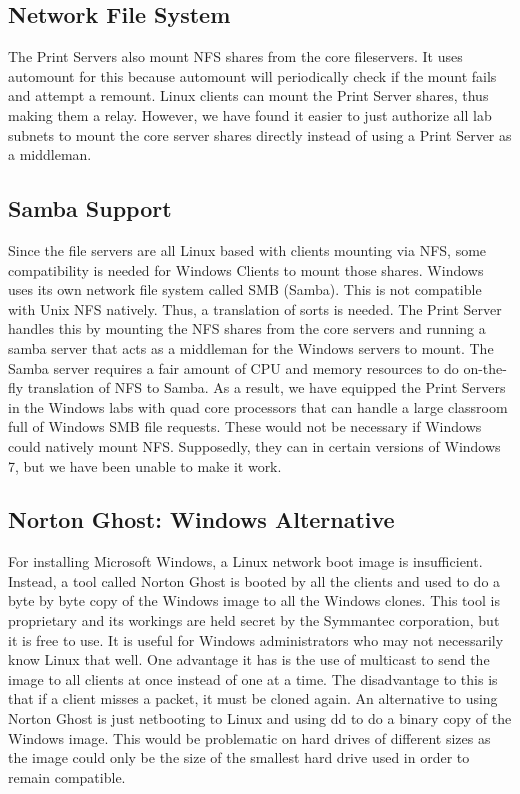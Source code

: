 \subsection{Network File System}
The Print Servers also mount NFS shares from the core fileservers.  It uses automount for this because automount will periodically check if the mount fails and attempt a remount.  Linux clients can mount the Print Server shares, thus making them a relay.  However, we have found it easier to just authorize all lab subnets to mount the core server shares directly instead of using a Print Server as a middleman.  

\subsection{Samba Support}
Since the file servers are all Linux based with clients mounting via NFS, some compatibility is needed for Windows Clients to mount those shares.  Windows uses its own network file system called SMB (Samba).  This is not compatible with Unix NFS natively.  Thus, a translation of sorts is needed.  The Print Server handles this by mounting the NFS shares from the core servers and running a samba server that acts as a middleman for the Windows servers to mount.  The Samba server requires a fair amount of CPU and memory resources to do on-the-fly translation of NFS to Samba. As a result, we have equipped the Print Servers in the Windows labs with quad core processors that can handle a large classroom full of Windows SMB file requests. These would not be necessary if Windows could natively mount NFS. Supposedly, they can in certain versions of Windows 7, but we have been unable to make it work.

\subsection{Norton Ghost:  Windows Alternative}
For installing Microsoft Windows, a Linux network boot image is insufficient.  Instead, a tool called Norton Ghost is booted by all the clients and used to do a byte by byte copy of the Windows image to all the Windows clones.  This tool is proprietary and its workings are held secret by the Symmantec corporation, but it is free to use.  It is useful for Windows administrators who may not necessarily know Linux that well.  One advantage it has is the use of multicast to send the image to all clients at once instead of one at a time.  The disadvantage to this is that if a client misses a packet, it must be cloned again.  An alternative to using Norton Ghost is just netbooting to Linux and using dd to do a binary copy of the Windows image.  This would be problematic on hard drives of different sizes as the image could only be the size of the smallest hard drive used in order to remain compatible.  

